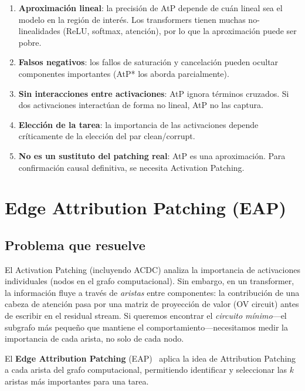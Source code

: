 \documentclass[11pt,a4paper]{report}
\theoremstyle{definition}
\begin{document}
\begin{enumerate}
    \item \textbf{Aproximación lineal}: la precisión de AtP depende de cuán lineal sea el modelo en la región de interés. Los transformers tienen muchas no-linealidades (ReLU, softmax, atención), por lo que la aproximación puede ser pobre.
    \item \textbf{Falsos negativos}: los fallos de saturación y cancelación pueden ocultar componentes importantes (AtP* los aborda parcialmente).
    \item \textbf{Sin interacciones entre activaciones}: AtP ignora términos cruzados. Si dos activaciones interactúan de forma no lineal, AtP no las captura.
    \item \textbf{Elección de la tarea}: la importancia de las activaciones depende críticamente de la elección del par clean/corrupt.
    \item \textbf{No es un sustituto del patching real}: AtP es una aproximación. Para confirmación causal definitiva, se necesita Activation Patching.
\end{enumerate}

\newpage

\chapter{Edge Attribution Patching (EAP)}
\label{ch:eap}

\section{Problema que resuelve}

El Activation Patching (incluyendo ACDC) analiza la importancia de activaciones individuales (nodos en el grafo computacional). Sin embargo, en un transformer, la información fluye a través de \emph{aristas} entre componentes: la contribución de una cabeza de atención pasa por una matriz de proyección de valor (OV circuit) antes de escribir en el residual stream. Si queremos encontrar el \emph{circuito mínimo}---el subgrafo más pequeño que mantiene el comportamiento---necesitamos medir la importancia de cada arista, no solo de cada nodo.

El \textbf{Edge Attribution Patching} (EAP)~\cite{syed2023eap} aplica la idea de Attribution Patching a cada arista del grafo computacional, permitiendo identificar y seleccionar las $k$ aristas más importantes para una tarea.
\end{document}
